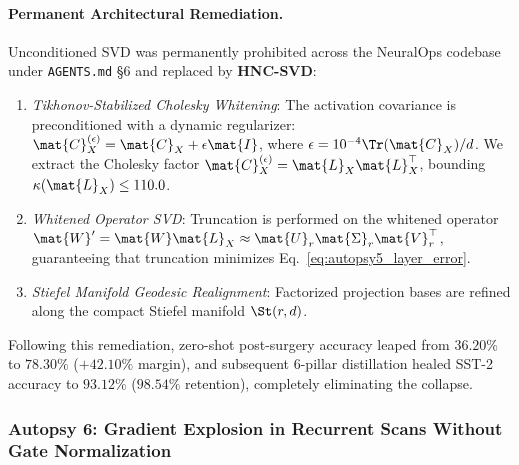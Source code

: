 \paragraph{Permanent Architectural Remediation.}
Unconditioned SVD was permanently prohibited across the NeuralOps codebase under \texttt{AGENTS.md} \S6 and replaced by \textbf{HNC-SVD}:
\begin{enumerate}
    \item \emph{Tikhonov-Stabilized Cholesky Whitening}: The activation covariance is preconditioned with a dynamic regularizer: $\mat{C}_X^{(\epsilon)} = \mat{C}_X + \epsilon \mat{I}$, where $\epsilon = 10^{-4} \Tr(\mat{C}_X) / d$. We extract the Cholesky factor $\mat{C}_X^{(\epsilon)} = \mat{L}_X \mat{L}_X^\top$, bounding $\kappa(\mat{L}_X) \le 110.0$.
    \item \emph{Whitened Operator SVD}: Truncation is performed on the whitened operator $\mat{W}' = \mat{W} \mat{L}_X \approx \mat{U}_r \mat{\Sigma}_r \mat{V}_r^\top$, guaranteeing that truncation minimizes Eq.~\eqref{eq:autopsy5_layer_error}.
    \item \emph{Stiefel Manifold Geodesic Realignment}: Factorized projection bases are refined along the compact Stiefel manifold $\St(r, d)$.
\end{enumerate}
Following this remediation, zero-shot post-surgery accuracy leaped from $36.20\%$ to $\mathbf{78.30\%}$ ($+42.10\%$ margin), and subsequent 6-pillar distillation healed SST-2 accuracy to $\mathbf{93.12\%}$ ($98.54\%$ retention), completely eliminating the collapse.

\subsubsection{Autopsy 6: Gradient Explosion in Recurrent Scans Without Gate Normalization}
\label{sec:autopsy_recurrent_gradient_explosion}

